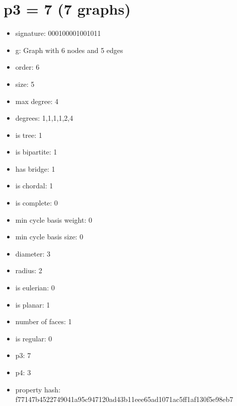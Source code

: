 \chapter{p3 = 7 (7 graphs)}
\newpage\begin{figure}
\end{figure}
\begin{itemize}
\item signature: 000100001001011
\item g: Graph with 6 nodes and 5 edges
\item order: 6
\item size: 5
\item max degree: 4
\item degrees: 1,1,1,1,2,4
\item is tree: 1
\item is bipartite: 1
\item has bridge: 1
\item is chordal: 1
\item is complete: 0
\item min cycle basis weight: 0
\item min cycle basis size: 0
\item diameter: 3
\item radius: 2
\item is eulerian: 0
\item is planar: 1
\item number of faces: 1
\item is regular: 0
\item p3: 7
\item p4: 3
\item property hash: f77147b4522749041a95c947120ad43b11eee65ad1071ac5ff1af130f5e98eb7
\end{itemize}
\newpage
\begin{figure}
\end{figure}
